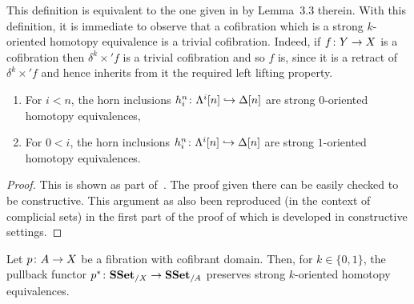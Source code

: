 \documentclass[reqno,10pt,a4paper,oneside,draft]{amsart}
\begin{document}
This definition is equivalent to the one given in \cite{gambino2017frobenius} by Lemma~3.3 therein.
With this definition, it is immediate to observe that a cofibration which is a strong $k$-oriented homotopy equivalence is a trivial cofibration. Indeed, if $f \colon Y \to X$ is a cofibration then $\delta^k \times ' f$ is a trivial
cofibration and so $f$ is, since it is a retract of $\delta^k \times ' f$ and hence inherits from it the
required left lifting property.

\begin{lemma}\label{lemma:genTcof_strongHequiv} \hfill 
\begin{enumerate}[$(i)$]
\item For $i < n$, the horn inclusions $h^n_i \colon \Lambda^i[n] \hookrightarrow \Delta[n]$ are strong $0$-oriented homotopy equivalences,
\item For $0 < i $, the horn inclusions $h^n_i \colon \Lambda^i[n] \hookrightarrow \Delta[n]$ are strong $1$-oriented homotopy equivalences.
\end{enumerate}
\end{lemma}

\begin{proof}
This is shown as part of~\cite[Theorem 3.2.3]{joyal-tierney:simplicial-homotopy-theory}. The proof given there can be easily checked to be constructive. This argument as also been reproduced (in the context of complicial sets) in the first part of the proof of \cite[Proposition~5.2.6]{henry2018wms} which is developed in constructive settings.
\end{proof}




\begin{lemma} 
\label{lemma:pb_of_StrongHomotopyEq}
Let $p \colon A \rightarrow X$ be a fibration with cofibrant domain. Then, for $k \in \{0,1\}$, 
the pullback functor $p^* \colon \mathbf{SSet}_{/X} \to \mathbf{SSet}_{/A}$ preserves strong $k$-oriented homotopy equivalences.
\end{lemma}
\end{document}
